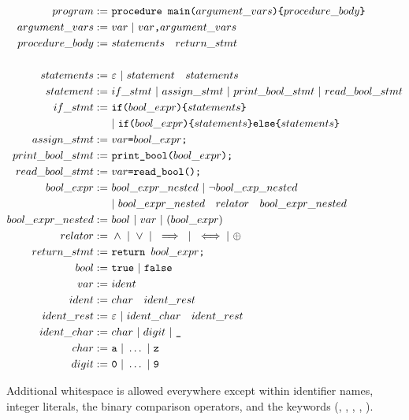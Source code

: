 \documentclass{article}
\newcommand\inParens[1]{\texttt{(}#1\texttt{)}}
\newcommand\inBraces[1]{\texttt{\{}#1\texttt{\}}}
\newcommand\comma{\texttt{,}}
\newcommand\semicolon{\texttt{;}}
\begin{document}
\begin{align*}
program :=& \ \texttt{procedure main}\inParens{argument\_vars} \inBraces{procedure\_body} \\
argument\_vars :=& \ var \ | \ var\comma argument\_vars \\
procedure\_body :=& \ statements \quad return\_stmt \\ \\
statements :=& \ \varepsilon \ | \ statement \quad statements \\
statement :=&  \ if\_stmt \ | \ assign\_stmt \ | \ print\_bool\_stmt \ | \ read\_bool\_stmt\\
if\_stmt :=& \ \texttt{if}\inParens{bool\_expr} \inBraces{statements}\\
& \ | \ \texttt{if}\inParens{bool\_expr} \inBraces{statements} \texttt{else}\inBraces{statements} \\
assign\_stmt :=& \ var \texttt{=} bool\_expr \semicolon \\
print\_bool\_stmt :=& \ \texttt{print\_bool}\inParens{bool\_expr}\semicolon \\
read\_bool\_stmt :=& \ var \texttt{=}\texttt{read\_bool}\inParens{}\semicolon \\
bool\_expr :=& \ bool\_expr\_nested \ | \ \neg bool\_exp\_nested \\
& \ | \ bool\_expr\_nested \quad relator \quad bool\_expr\_nested \\
bool\_expr\_nested :=& \ bool \ | \ var \ | \ (bool\_expr) \\
relator :=& \ \land \ | \ \lor \ | \ \implies \ | \ \iff | \ \oplus \\
return\_stmt :=& \ \texttt{return }\space bool\_expr \semicolon\\
bool :=& \ \texttt{true} \ | \ \texttt{false} \\
var :=& \ ident \\
ident :=& \ char \quad ident\_rest \\
ident\_rest :=& \ \varepsilon \ | \ ident\_char \quad ident\_rest \\
ident\_char :=& \ char \ | \ digit \ | \ \texttt{\_} \\
char :=& \ \texttt{a} \ | \ \ldots \ | \ \texttt{z} \\
digit :=& \ \texttt{0} \ | \ \ldots \ | \ \texttt{9}
\end{align*}

Additional whitespace is allowed everywhere except within identifier names, integer literals, 
the binary comparison operators, and the keywords (, , , , ).
\end{document}
